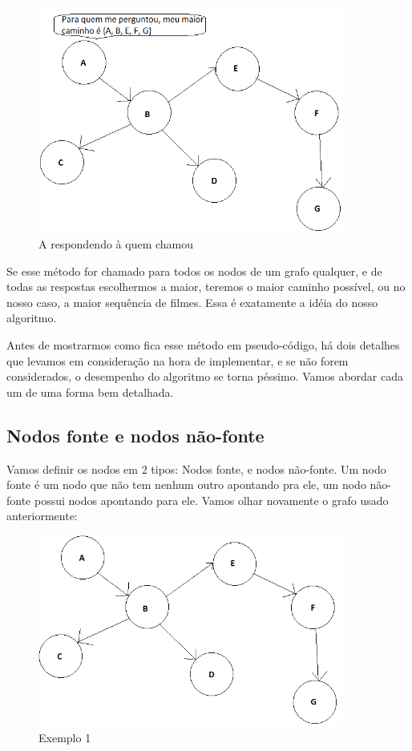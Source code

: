\documentclass[12pt]{article}
\begin{document}
\begin{figure}[H]
\centering
\includegraphics[width=100mm]{graphAr.png}
\caption{A respondendo à quem chamou}
\label{graphAr}
\end{figure}

Se esse método for chamado para todos os nodos de um grafo qualquer, e de todas
as respostas escolhermos a maior, teremos o maior caminho possível, ou no nosso
caso, a maior sequência de filmes. Essa é exatamente a idéia do nosso algoritmo.

Antes de mostrarmos como fica esse método em pseudo-código, há dois detalhes que
levamos em consideração na hora de implementar, e se não forem considerados, o
desempenho do algoritmo se torna péssimo. Vamos abordar cada um de uma forma bem
detalhada.

\subsection{Nodos fonte e nodos não-fonte}

Vamos definir os nodos em 2 tipos: Nodos fonte, e nodos não-fonte. Um nodo fonte
é um nodo que não tem nenhum outro apontando pra ele, um nodo não-fonte possui
nodos apontando para ele. Vamos olhar novamente o grafo usado anteriormente:

\begin{figure}[H]
\centering
\includegraphics[width=100mm]{graph.png}
\caption{Exemplo 1}
\label{graphex}
\end{figure}
\end{document}
